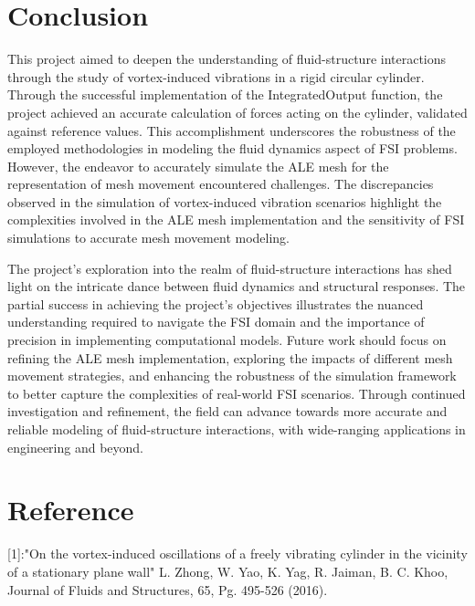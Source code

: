 \documentclass[a4paper,12pt]{article} %
\begin{document}
\newpage
\section*{Conclusion}
This project aimed to deepen the understanding of fluid-structure interactions through the study of vortex-induced vibrations in a rigid circular cylinder. Through the successful implementation of the IntegratedOutput function, the project achieved an accurate calculation of forces acting on the cylinder, validated against reference values. This accomplishment underscores the robustness of the employed methodologies in modeling the fluid dynamics aspect of FSI problems. However, the endeavor to accurately simulate the ALE mesh for the representation of mesh movement encountered challenges. The discrepancies observed in the simulation of vortex-induced vibration scenarios highlight the complexities involved in the ALE mesh implementation and the sensitivity of FSI simulations to accurate mesh movement modeling.

The project's exploration into the realm of fluid-structure interactions has shed light on the intricate dance between fluid dynamics and structural responses. The partial success in achieving the project's objectives illustrates the nuanced understanding required to navigate the FSI domain and the importance of precision in implementing computational models. Future work should focus on refining the ALE mesh implementation, exploring the impacts of different mesh movement strategies, and enhancing the robustness of the simulation framework to better capture the complexities of real-world FSI scenarios. Through continued investigation and refinement, the field can advance towards more accurate and reliable modeling of fluid-structure interactions, with wide-ranging applications in engineering and beyond.
\section*{Reference}
[1]:"On the vortex-induced oscillations of a freely vibrating cylinder in the vicinity of a stationary plane wall" L.
Zhong, W. Yao, K. Yag, R. Jaiman, B. C. Khoo, Journal of Fluids and Structures, 65, Pg. 495-526 (2016).
\end{document}
